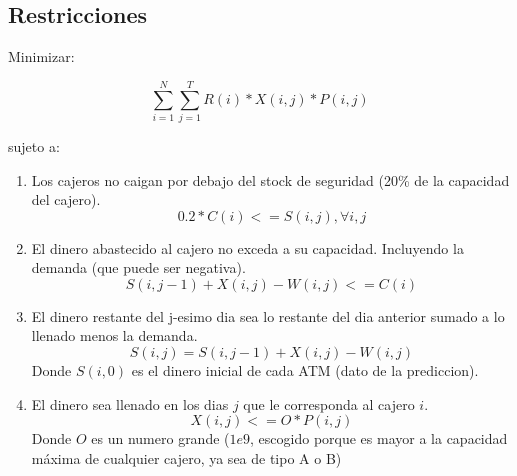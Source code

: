 \documentclass{article}
\begin{document}
\subsection{Restricciones}

Minimizar:

$$
\sum_{i=1}^{N} \sum_{j=1}^{T} R(i) * X(i, j) * P(i, j)
$$

sujeto a:

\begin{enumerate}
    \item Los cajeros no caigan por debajo del stock de seguridad (20\% de la capacidad del cajero).
        $$0.2 * C(i) <= S(i, j) , \forall i, j$$
    \item El dinero abastecido al cajero no exceda a su capacidad. Incluyendo la demanda (que puede ser negativa).
        $$S(i, j-1) + X(i, j) - W(i, j) <= C(i)$$
    \item El dinero restante del j-esimo dia sea lo restante del dia anterior sumado a lo llenado menos la demanda.
        $$S(i, j) = S(i, j-1) + X(i, j) - W(i, j)$$
        Donde $S(i, 0)$ es el dinero inicial de cada ATM (dato de la prediccion).
    \item El dinero sea llenado en los dias $j$ que le corresponda al cajero $i$.
        $$X(i, j) <= O * P(i, j)$$
        Donde $O$ es un numero grande ($1e9$, escogido porque es mayor a la capacidad máxima de cualquier cajero, ya sea de tipo A o B)
\end{enumerate}
\end{document}
